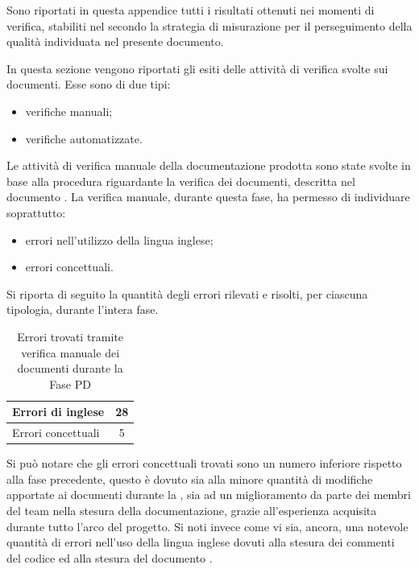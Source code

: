 
Sono riportati in questa appendice tutti i risultati
ottenuti nei momenti di verifica, stabiliti nel  secondo la strategia di misurazione per il perseguimento della qualità
individuata nel presente documento.

		In questa sezione vengono riportati gli esiti delle attività di verifica svolte sui documenti. Esse sono di due tipi:
		\begin{itemize}
			\item verifiche manuali;
			\item verifiche automatizzate.
		\end{itemize}
			Le attività di verifica manuale della documentazione prodotta sono state svolte in base alla procedura riguardante la verifica dei documenti, descritta nel documento .
			La verifica manuale, durante questa fase, ha permesso di individuare soprattutto:
			\begin{itemize}
			\item errori nell'utilizzo della lingua inglese;
			\item errori concettuali.
			\end{itemize}
			Si riporta di seguito la quantità degli errori rilevati e risolti, per ciascuna tipologia, durante l'intera fase.
			\begin{table}[H]
				\centering
					\begin{tabu}{| l | c |} \hline
						Errori di inglese & 28\\ \hline
						Errori concettuali & 5 \\ \hline
					\end{tabu}
					\caption{Errori trovati tramite verifica manuale dei documenti durante la Fase PD}
			\end{table}
			Si può notare che gli errori concettuali trovati sono un numero inferiore rispetto alla fase precedente, questo è dovuto sia alla minore quantità di modifiche apportate ai documenti durante la , sia ad un miglioramento da parte dei membri del team nella stesura della documentazione, grazie all'esperienza acquisita durante tutto l'arco del progetto.
			Si noti invece come vi sia, ancora, una notevole quantità di errori nell'uso della lingua inglese dovuti alla stesura dei commenti del codice ed alla stesura del documento .

